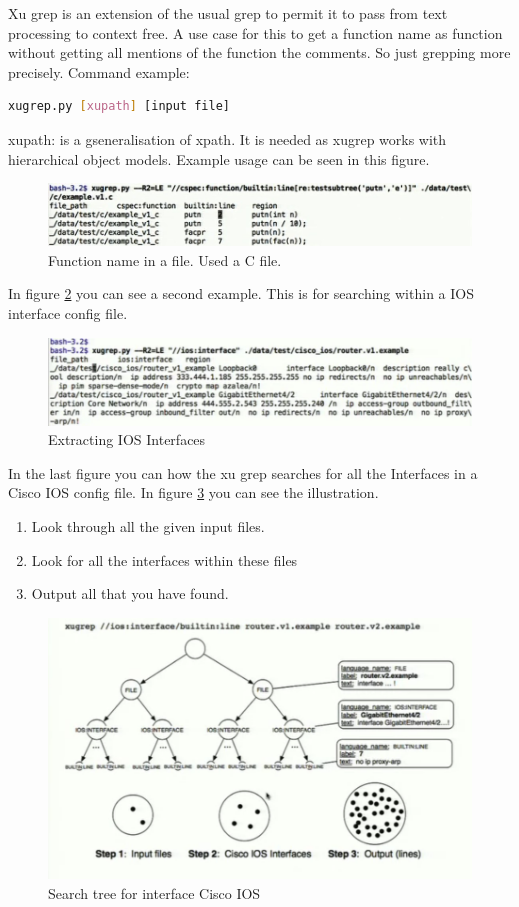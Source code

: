 Xu grep is an extension of the usual grep to permit it to pass from text processing to context free. A use case for this to get a function name as function without getting all mentions of the function the comments. So just grepping more precisely.
Command example:
\begin{lstlisting}[language=bash]
   xugrep.py [xupath] [input file]
\end{lstlisting}

xupath: is a gseneralisation of xpath. It is needed as xugrep works with hierarchical object models.
Example usage can be seen in this figure.

\begin{figure}
\label{fig:example1xugrep}
\caption{Function name in a file. Used a C file.}
\includegraphics[width=\textwidth]{images/example1xugrep.jpg}
\end{figure}

In figure \ref{fig:example2xugrep} you can see a second example. This is for searching within a IOS interface config file.

\begin{figure}
\label{fig:example2xugrep}
\caption{Extracting IOS Interfaces}
\includegraphics[width=\textwidth]{images/example2xugrep.png}
\end{figure}

In the last figure you can how the xu grep searches for all the Interfaces in a Cisco IOS config file. In figure \ref{fig:example3xugrep} you can see the illustration.
\begin{enumerate}
\item Look through all the given input files.
\item Look for all the interfaces within these files
\item Output all that you have found. 
\end{enumerate}

\begin{figure}
\label{fig:example3xugrep}
\caption{Search tree for interface Cisco IOS}
\includegraphics[width=\textwidth]{images/example3xugrep.png}
\end{figure}